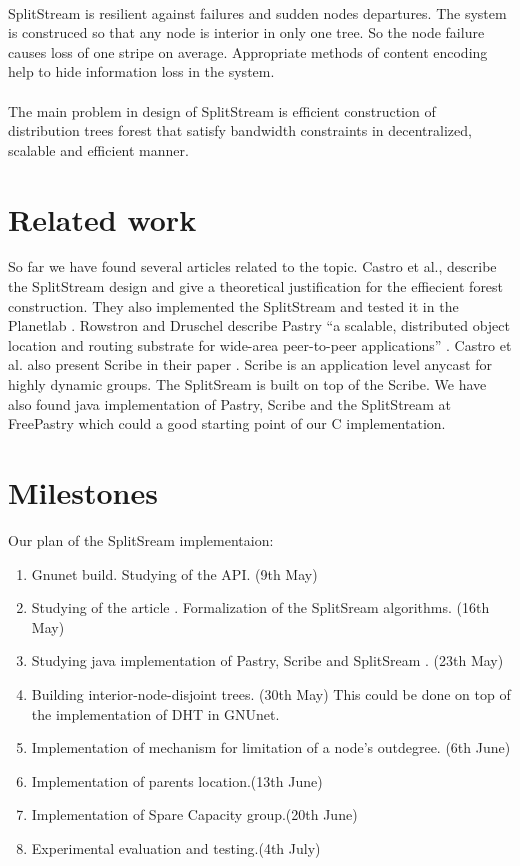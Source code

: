 \documentclass[a4paper,10pt]{article}
\begin{document}
\paragraph{}
SplitStream is resilient against failures and sudden nodes departures. The system is construced so that any node is interior
in only one tree. So the node failure causes loss of one stripe on average. Appropriate methods of content encoding help to
hide information loss in the system.
\paragraph{}
The main problem in design of  SplitStream is efficient construction of distribution trees forest that satisfy bandwidth
constraints in decentralized, scalable and efficient manner.
\section{Related work}
So far we have found several articles related to the topic. Castro et al.\cite{castro1}, \cite{castro2} describe the 
SplitStream design and give a theoretical justification for the effiecient forest construction. They also implemented
the SplitStream and tested it in the Planetlab \cite{Planetlab}. Rowstron and Druschel\cite{Rowstron} describe Pastry
``a scalable, distributed object location and routing substrate for wide-area peer-to-peer applications'' \cite{Rowstron}.
Castro et al. also present Scribe in their paper \cite{castro3}. Scribe is an application level anycast for highly dynamic
groups. The SplitSream is built on top of the Scribe. We have also found java implementation of Pastry, Scribe and the
SplitStream at FreePastry \cite{FreePastry} which could a good starting point of our C implementation.
\section{Milestones}
Our plan of the SplitSream implementaion:
\begin{enumerate}
 \item Gnunet\cite{GNUnet} build. Studying of the API. (9th May)
 \item Studying of the article \cite{castro1}. Formalization of the SplitSream algorithms. (16th May)
 \item Studying java implementation of Pastry, Scribe and SplitSream \cite{FreePastry}. (23th May)
 \item Building interior-node-disjoint trees. (30th May)
 \subitem This could be done on top of the implementation of DHT in GNUnet.
 \item Implementation of mechanism for limitation of a node's outdegree. (6th June)
 \item Implementation of parents location.(13th June)
 \item Implementation of Spare Capacity group.(20th June)
 \item Experimental evaluation and testing.(4th July)
\end{enumerate}

{}

\end{document}
